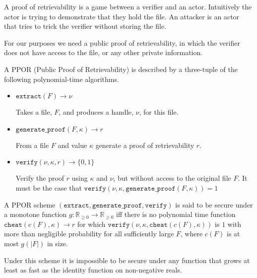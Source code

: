 \documentclass[10pt,twoside,a4paper]{article}
\begin{document}
A proof of retrievability is a game between a verifier and an actor.
Intuitively the actor is trying to demonstrate that they hold the file.
An attacker is an actor that tries to trick the verifier without storing the file.




%
%
%



For our purposes we need a public proof of retrievability, in which the verifier does not have access to the file,
or any other private information.

A PPOR (Public Proof of Retrievability) is described by a three-tuple of the following polynomial-time algorithms.

\begin{itemize}
\item $\texttt{extract}(F) \to \nu$

Takes a file, $F$, and produces a handle, $\nu$, for this file.


\item $\texttt{generate\_proof}(F, \kappa) \to r$

From a file $F$ and value $\kappa$ generate a proof of retrievability $r$.

\item $\texttt{verify}(\nu, \kappa, r) \to \{0, 1\}$

Verify the proof $r$ using $\kappa$ and $\nu$, but without access to the original file $F$.
It must be the case that $\texttt{verify}(\nu, \kappa, \texttt{generate\_proof}(F, \kappa)) = 1$
\end{itemize}

A PPOR scheme $(\texttt{extract}, \texttt{generate\_proof}, \texttt{verify})$ is said to be secure under a monotone function $g: \mathbb{R}_{\geq 0} \to \mathbb{R}_{\geq 0}$ iff
there is no polynomial time function
$\texttt{cheat}(c(F), \kappa) \to r$ for which $\texttt{verify}(\nu, \kappa, \texttt{cheat}(c(F), \kappa))$
is $1$ with more than negligible probability for all sufficiently large $F$,
where $c(F)$ is at most $g(|F|)$ in size.

Under this scheme it is impossible to be secure under any function that grows at least as fast as the identity function on non-negative reals.
\end{document}
